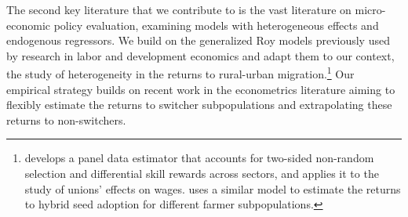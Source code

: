 

The second key literature that we contribute to is the vast literature on micro-economic policy evaluation, examining models with heterogeneous effects and endogenous regressors.
We build on the generalized Roy models previously used by research in labor and development economics and adapt them to our context, the study of heterogeneity in the returns to rural-urban migration.\footnote{\cite{lemieuxEstimatingEffectsUnions1998} develops a panel data estimator that accounts for two-sided non-random selection and differential skill rewards across sectors, and applies it to the study of unions' effects on wages. \cite{suriSelectionComparativeAdvantage2011} uses a similar model to estimate the returns to hybrid seed adoption for different farmer subpopulations.}
Our empirical strategy builds on recent work in the econometrics literature \citep{verdierAverageTreatmentEffects2020a,tjernstromCommentSuri2011} aiming to flexibly estimate the returns to switcher subpopulations and extrapolating these returns to non-switchers.

